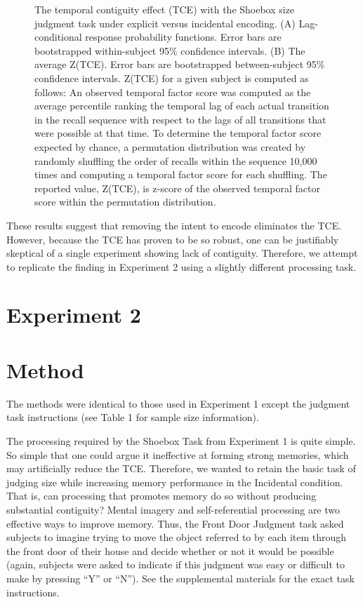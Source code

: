 \documentclass[man,natbib,floatsintext]{apa6} %
\begin{document}
\newcommand\paneltext{(A) Lag-conditional response probability functions. Error bars are bootstrapped within-subject 95\% confidence intervals. (B) The average Z(TCE).  Error bars are bootstrapped between-subject 95\% confidence intervals. Z(TCE) for a given subject is computed as follows: An observed temporal factor score was computed as the average percentile ranking the temporal lag of each actual transition in the recall sequence with respect to the lags of all transitions that were possible at that time. To determine the temporal factor score expected by chance, a permutation distribution was created by randomly shuffling the order of recalls within the sequence 10,000 times and computing a temporal factor score for each shuffling. The reported value, Z(TCE), is z-score of the observed temporal factor score within the permutation distribution.}
\begin{figure}
\caption{The temporal contiguity effect (TCE) with the Shoebox size judgment task under explicit versus incidental encoding. \paneltext}
\label{shoebox}
\end{figure}

These results suggest that removing the intent to encode eliminates the TCE. However, because the TCE has proven to be so robust, one can be justifiably skeptical of a single experiment showing lack of contiguity. Therefore, we attempt to replicate the finding in Experiment 2 using a slightly different processing task.

\section{Experiment 2}
\section{Method}

The methods were identical to those used in Experiment 1 except the judgment task instructions (see Table 1 for sample size information).

The processing required by the Shoebox Task from Experiment 1 is quite simple. So simple that one could argue it ineffective at forming strong memories, which may artificially reduce the TCE. Therefore, we wanted to retain the basic task of judging size while increasing memory performance in the Incidental condition. That is, can processing that promotes memory do so without producing substantial contiguity? Mental imagery and self-referential processing are two effective ways to improve memory. Thus, the Front Door Judgment task asked subjects to imagine trying to move the object referred to by each item through the front door of their house and decide whether or not it would be possible (again, subjects were asked to indicate if this judgment was easy or difficult to make by pressing ``Y'' or ``N'').
See the supplemental materials for the exact task instructions.
\end{document}
